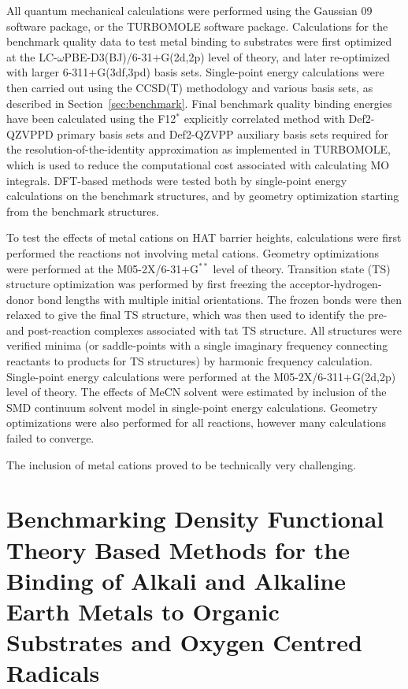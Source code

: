 All quantum mechanical calculations were performed using the Gaussian 09 software package,\cite{Frisch2009} or the TURBOMOLE software package.\cite{turbomle} Calculations for the benchmark quality data to test metal binding to substrates were first optimized at the LC-$\omega$PBE-D3(BJ)/6-31+G(2d,2p) level of theory, and later re-optimized with larger 6-311+G(3df,3pd) basis sets. Single-point energy calculations were then carried out using the CCSD(T) methodology and various basis sets, as described in Section~\ref{sec:benchmark}. Final benchmark quality binding energies have been calculated using the F12$^*$ explicitly correlated method with Def2-QZVPPD primary basis sets and Def2-QZVPP auxiliary basis sets required for the resolution-of-the-identity approximation as implemented in TURBOMOLE, which is used to reduce the computational cost associated with calculating MO integrals.\cite{note-book} DFT-based methods were tested both by single-point energy calculations on the benchmark structures, and by geometry optimization starting from the benchmark structures.

To test the effects of metal cations on HAT barrier heights, calculations were first performed the reactions not involving metal cations. Geometry optimizations were performed at the M05-2X/6-31+G$^{**}$ level of theory. Transition state (TS) structure optimization was performed by first freezing the acceptor-hydrogen-donor bond lengths with multiple initial orientations. The frozen bonds were then relaxed to give the final TS structure, which was then used to identify the pre- and post-reaction complexes associated with tat TS structure. All structures were verified minima (or saddle-points with a single imaginary frequency connecting reactants to products for TS structures) by harmonic frequency calculation. Single-point energy calculations were performed at the M05-2X/6-311+G(2d,2p) level of theory. The effects of MeCN solvent were estimated by inclusion of the SMD continuum solvent model in single-point energy calculations. Geometry optimizations were also performed for all reactions, however many calculations failed to converge.

The inclusion of metal cations proved to be technically very challenging. 



\section{Benchmarking Density Functional Theory Based Methods for the Binding of Alkali and Alkaline Earth Metals to Organic Substrates and Oxygen Centred Radicals}

